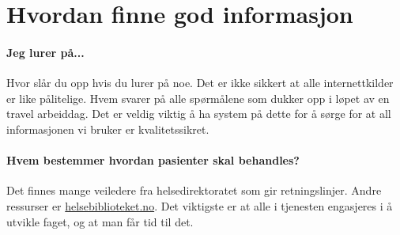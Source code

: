 		\section{Hvordan finne god informasjon}
			\paragraph{Jeg lurer på...\\}
				Hvor slår du opp hvis du lurer på noe. Det er ikke sikkert at alle internettkilder er like pålitelige. Hvem svarer på alle spørmålene som dukker opp i løpet av en travel arbeiddag. Det er veldig viktig å ha system på dette for å sørge for at all informasjonen vi bruker er kvalitetssikret. 
			\paragraph{Hvem bestemmer hvordan pasienter skal behandles?\\}
				Det finnes mange veiledere fra helsedirektoratet som gir retningslinjer. Andre ressurser er \href{http://www.helsebiblioteket.no/}{helsebiblioteket.no}. Det viktigste er at alle i tjenesten engasjeres i å utvikle faget, og at man får tid til det. 
